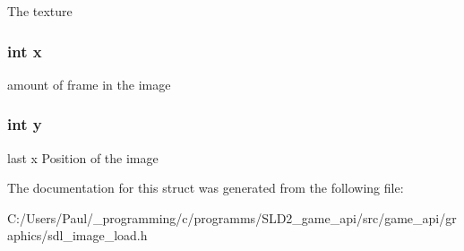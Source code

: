The texture \hypertarget{struct___image_a6150e0515f7202e2fb518f7206ed97dc}{
\subsubsection[{x}]{\setlength{\rightskip}{0pt plus 5cm}int x}}\label{struct___image_a6150e0515f7202e2fb518f7206ed97dc}
amount of frame in the image \hypertarget{struct___image_a0a2f84ed7838f07779ae24c5a9086d33}{
\subsubsection[{y}]{\setlength{\rightskip}{0pt plus 5cm}int y}}\label{struct___image_a0a2f84ed7838f07779ae24c5a9086d33}
last x Position of the image 

The documentation for this struct was generated from the following file\+:\begin{DoxyCompactItemize}
\item 
C\+:/\+Users/\+Paul/\+\_\+programming/c/programms/\+S\+L\+D2\+\_\+game\+\_\+api/src/game\+\_\+api/graphics/sdl\+\_\+image\+\_\+load.\+h\end{DoxyCompactItemize}
